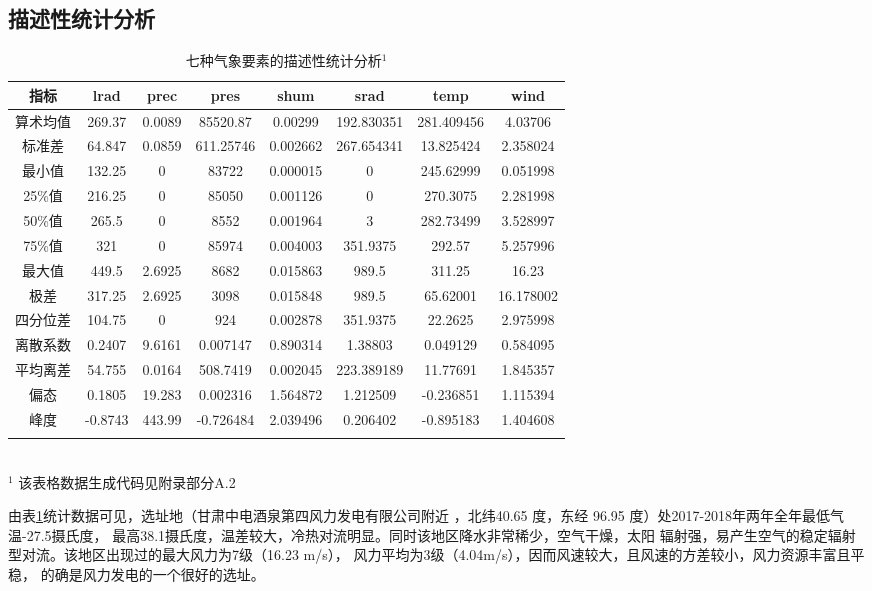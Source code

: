 \documentclass[AutoFakeBold]{LZUThesis}
\begin{document}
\subsection{描述性统计分析}

\begin{table}[H]
    \centering
    \caption{七种气象要素的描述性统计分析$^1$}
    \begin{tabular}{cccccccc}
    \toprule
    指标 & lrad & prec & pres & shum & srad & temp & wind \\
    \midrule
    算术均值 & 269.37 & 0.0089 & 85520.87 & 0.00299 & 192.830351 & 281.409456 & 4.03706 \\
    标准差 & 64.847 & 0.0859 & 611.25746 & 0.002662 & 267.654341 & 13.825424 & 2.358024 \\
    最小值 & 132.25 & 0 & 83722 & 0.000015 & 0 & 245.62999 & 0.051998 \\
    25\%值 & 216.25 & 0 & 85050 & 0.001126 & 0 & 270.3075 & 2.281998 \\
    50\%值 & 265.5 & 0 & 8552 & 0.001964 & 3 & 282.73499 & 3.528997 \\
    75\%值 & 321 & 0 & 85974 & 0.004003 & 351.9375 & 292.57 & 5.257996 \\
    最大值 & 449.5 & 2.6925 & 8682 & 0.015863 & 989.5 & 311.25 & 16.23 \\
    极差 & 317.25 & 2.6925 & 3098 & 0.015848 & 989.5 & 65.62001 & 16.178002 \\
    四分位差 & 104.75 & 0 & 924 & 0.002878 & 351.9375 & 22.2625 & 2.975998 \\
    离散系数 & 0.2407 & 9.6161 & 0.007147 & 0.890314 & 1.38803 & 0.049129 & 0.584095 \\
    平均离差 & 54.755 & 0.0164 & 508.7419 & 0.002045 & 223.389189 & 11.77691 & 1.845357 \\
    偏态 & 0.1805 & 19.283 & 0.002316 & 1.564872 & 1.212509 & -0.236851 & 1.115394 \\
    峰度 & -0.8743 & 443.99 & -0.726484 & 2.039496 & 0.206402 & -0.895183 & 1.404608 \\
    \bottomrule \\
    \end{tabular} \\
    \footnotesize{$^1$ 该表格数据生成代码见附录部分A.2} \\
    \label{analysis}
\end{table}

由表\ref{analysis}统计数据可见，选址地（甘肃中电酒泉第四风力发电有限公司附近
，北纬40.65 度，东经 96.95 度）处2017-2018年两年全年最低气温-27.5摄氏度，
最高38.1摄氏度，温差较大，冷热对流明显。同时该地区降水非常稀少，空气干燥，太阳
辐射强，易产生空气的稳定辐射型对流。该地区出现过的最大风力为7级（16.23 m/s），
风力平均为3级（4.04m/s），因而风速较大，且风速的方差较小，风力资源丰富且平稳，
的确是风力发电的一个很好的选址。
\end{document}
